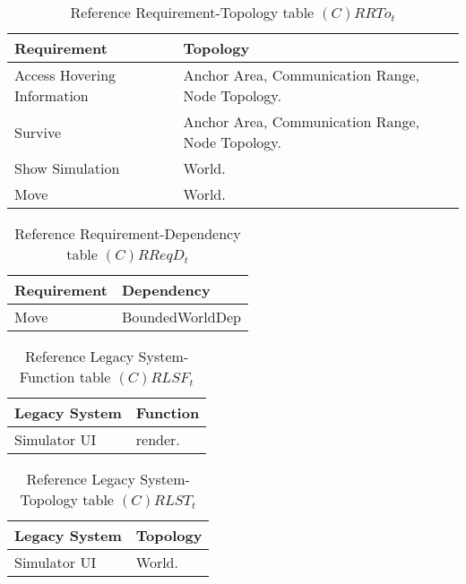 \begin{table}[H]
	\centering
	\begin{tabular}{|p{4cm}|p{8cm}|}
			\hline
			\textbf{Requirement} & \textbf{Topology} \\
			\hline
			Access Hovering Information & Anchor Area, Communication Range, Node Topology. \\
			\hline
			Survive & Anchor Area, Communication Range, Node Topology. \\
			\hline
			Show Simulation & World. \\
			\hline
			Move & World. \\
			\hline
		\end{tabular}
	\caption{Reference Requirement-Topology table $(C)RRTo_t$}
	\label{tab:crrtot}
\end{table}

\begin{table}[H]
	\centering
	\begin{tabular}{|p{4cm}|p{8cm}|}
			\hline
			\textbf{Requirement} & \textbf{Dependency} \\
			\hline
			Move & BoundedWorldDep  \\
			\hline
		\end{tabular}
		\caption{Reference Requirement-Dependency table $(C)RReqD_t$}
	\label{tab:crreqdt}
\end{table}

\begin{table}[H]
	\centering
	\begin{tabular}{|p{4cm}|p{8cm}|}
			\hline
			\textbf{Legacy System} & \textbf{Function} \\
			\hline
			Simulator UI & render. \\
			\hline
		\end{tabular}
	\caption{Reference Legacy System-Function table $(C)RLSF_t$}
	\label{tab:crlsft}
\end{table}

\begin{table}[H]
	\centering
	\begin{tabular}{|p{4cm}|p{8cm}|}
			\hline
			\textbf{Legacy System} & \textbf{Topology} \\
			\hline
			Simulator UI & World. \\
			\hline
		\end{tabular}
	\caption{Reference Legacy System-Topology table $(C)RLST_t$}
	\label{tab:crlsTt}
\end{table}

